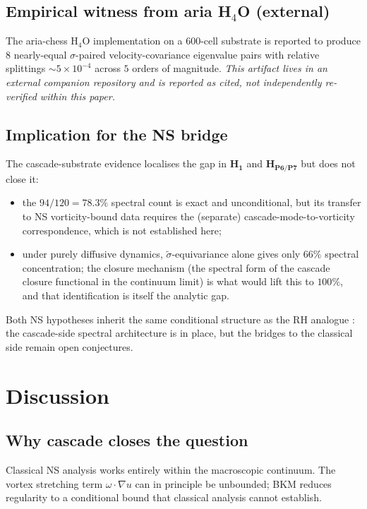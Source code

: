 \documentclass[11pt, a4paper]{amsart}
\theoremstyle{definition}
\begin{document}
\subsection{Empirical witness from aria H$_4$O (external)}

The aria-chess H$_4$O implementation \cite{ariaH4Olaw} on a
600-cell substrate is reported to produce $8$ nearly-equal
$\sigma$-paired velocity-covariance eigenvalue pairs with relative
splittings $\sim 5\times 10^{-4}$ across $5$ orders of magnitude.
\emph{This artifact lives in an external companion repository and
is reported as cited, not independently re-verified within this
paper.}

\subsection{Implication for the NS bridge}

The cascade-substrate evidence localises the gap in $\mathbf{H_1}$
and $\mathbf{H_{P6/P7}}$ but does not close it:
\begin{itemize}
\item the $94/120 = 78.3\%$ spectral count is exact and
unconditional, but its transfer to NS vorticity-bound data
requires the (separate) cascade-mode-to-vorticity correspondence,
which is not established here;
\item under purely diffusive dynamics, $\widetilde\sigma$-equivariance
alone gives only $66\%$ spectral concentration; the closure
mechanism (the spectral form of the cascade closure functional in
the continuum limit) is what would lift this to $100\%$, and that
identification is itself the analytic gap.
\end{itemize}
Both NS hypotheses inherit the same conditional structure as the
RH analogue \cite[Remark rmk:strengthened]{CascadeRHformal}: the
cascade-side spectral architecture is in place, but the bridges to
the classical side remain open conjectures.

\section{Discussion}\label{sec:disc}

\subsection{Why cascade closes the question}

Classical NS analysis works entirely within the macroscopic continuum.
The vortex stretching term $\omega \cdot \nabla u$ can in principle
be unbounded; BKM reduces regularity to a conditional bound that
classical analysis cannot establish.
\end{document}
